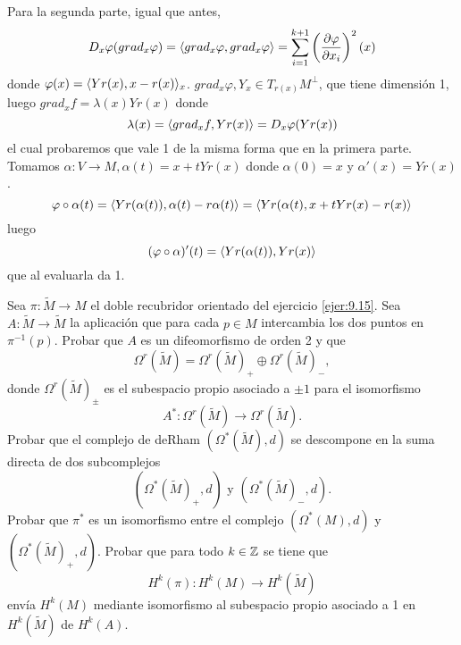 \documentclass[twoside]{article}
\begin{document}
\begin{solucion}
Para la segunda parte, igual que antes, 
\[
D_x\varphi(grad_x\varphi)=\langle{grad_x\varphi,grad_x\varphi}\rangle=\sum_{i=1}^{k+1}\left(\frac{\partial \varphi}{\partial x_i}\right)^2(x)
\]
donde $\varphi(x)=\langle{Yr(x), x-r(x)}\rangle_x$. $grad_x\varphi, Y_x\in T_{r(x)}M^\perp$, que tiene dimensión 1, luego $grad_xf=\lambda(x)Yr(x)$ donde
\[
\lambda(x)=\langle{grad_xf,Yr(x)}\rangle=D_x\varphi(Yr(x))
\]
el cual probaremos que vale 1 de la misma forma que en la primera parte. Tomamos $\alpha:V\to M, \alpha(t)=x+tYr(x)$ donde $\alpha(0)=x$ y $\alpha'(x)=Yr(x)$. 
\[
\varphi\circ\alpha(t)=\langle{Yr(\alpha(t)), \alpha(t)-r\alpha(t)}\rangle=\langle{Yr(\alpha(t), x+tYr(x)-r(x)}\rangle
\] 
luego
\[
(\varphi\circ\alpha)'(t)=\langle{Yr(\alpha(t)), Yr(x)}\rangle
\]
que al evaluarla da 1. 
\end{solucion}
\newpage

\begin{ejercicio}{9.18}
Sea $\pi:\widetilde{M}\to M$ el doble recubridor orientado del ejercicio \ref{ejer:9.15}. Sea $A:\widetilde{M}\to \widetilde{M}$ la aplicación que para cada $p\in M$ intercambia los dos puntos en $\pi^{-1}(p)$. Probar que $A$ es un difeomorfismo de orden 2 y que
\[
\Omega^r(\widetilde{M})=\Omega^r(\widetilde{M})_+\oplus\Omega^r(\widetilde{M})_-,
\]
donde $\Omega^r(\widetilde{M})_\pm$ es el subespacio propio asociado a $\pm 1$ para el isomorfismo
\[
A^*:\Omega^r(\widetilde{M})\to \Omega^r(\widetilde{M}).
\]
Probar que el complejo de deRham $(\Omega^*(\widetilde{M}),d)$ se descompone en la suma directa de dos subcomplejos
\[
(\Omega^*(\widetilde{M})_+,d)\text{ y } (\Omega^*(\widetilde{M})_-,d).
\]
Probar que $\pi^*$ es un isomorfismo entre el complejo $(\Omega^*(M),d)$ y $(\Omega^*(\widetilde{M})_+,d)$. Probar que para todo $k\in\mathbb{Z}$ se tiene que
\[
H^k(\pi):H^k(M)\to H^k(\widetilde{M})
\]
envía $H^k(M)$ mediante isomorfismo al subespacio propio asociado a 1 en $H^k(\widetilde{M})$ de $H^k(A)$. 
\end{ejercicio}
\end{document}
